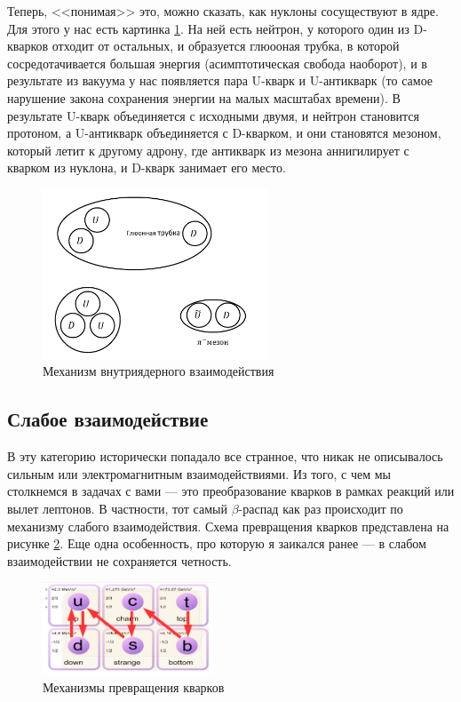 \documentclass[12pt]{article}
\begin{document}
Теперь, <<понимая>> это, можно сказать, как нуклоны сосуществуют в ядре. Для этого у нас есть картинка \ref{fig:sem_11_nuclei}. На ней есть нейтрон, у которого один из D-кварков отходит от остальных, и образуется глюооная трубка, в которой сосредотачивается большая энергия (асимптотическая свобода наоборот), и в результате из вакуума у нас появляется пара U-кварк и U-антикварк (то самое нарушение закона сохранения энергии на малых масштабах времени). В результате U-кварк объединяется с исходными двумя, и нейтрон становится протоном, а U-антикварк объединяется с D-кварком, и они становятся мезоном, который летит к другому адрону, где антикварк из мезона аннигилирует с кварком из нуклона, и D-кварк занимает его место.

\begin{figure}[h!]
    \centering
    \includegraphics[width=0.6\textwidth,height=\textheight,keepaspectratio]{Seminar_11-12/pics/pic_03_nuclei.pdf}
    \caption{Механизм внутриядерного взаимодействия}
    \label{fig:sem_11_nuclei}
\end{figure}

\subsection{Слабое взаимодействие}
В эту категорию исторически попадало все странное, что никак не описывалось сильным или электромагнитным взаимодействиями. Из того, с чем мы столкнемся в задачах с вами --- это преобразование кварков в рамках реакций или вылет лептонов. В частности, тот самый $\beta$-распад как раз происходит по механизму слабого взаимодействия. Схема превращения кварков представлена на рисунке \ref{fig:sem_11_weak}. Еще одна особенность, про которую я заикался ранее --- в слабом взаимодействии не сохраняется четность. 
\begin{figure}[h]
    \centering
    \includegraphics[width=0.45\textwidth,height=\textheight,keepaspectratio]{Seminar_11-12/pics/pic_04_weak.PNG}
    \caption{Механизмы превращения кварков}
    \label{fig:sem_11_weak}
\end{figure}
\end{document}
